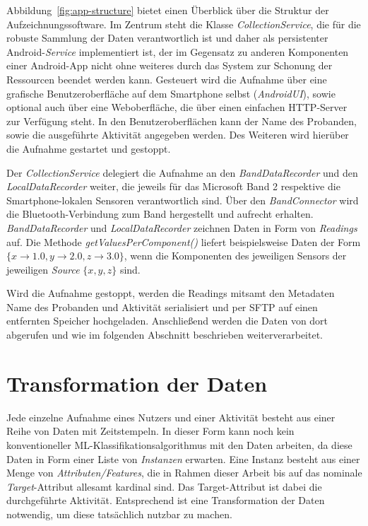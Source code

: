Abbildung~\ref{fig:app-structure} bietet einen Überblick über die Struktur der Aufzeichnungssoftware. Im Zentrum steht die Klasse \textit{CollectionService}, die für die robuste Sammlung der Daten verantwortlich ist und daher als persistenter Android-\textit{Service} implementiert ist, der im Gegensatz zu anderen Komponenten einer Android-App nicht ohne weiteres durch das System zur Schonung der Ressourcen beendet werden kann. Gesteuert wird die Aufnahme über eine grafische Benutzeroberfläche auf dem Smartphone selbst (\textit{AndroidUI}), sowie optional auch über eine Weboberfläche, die über einen einfachen HTTP-Server zur Verfügung steht. In den Benutzeroberflächen kann der Name des Probanden, sowie die ausgeführte Aktivität angegeben werden. Des Weiteren wird hierüber die Aufnahme gestartet und gestoppt.

Der \textit{CollectionService} delegiert die Aufnahme an den \textit{BandDataRecorder} und den \textit{LocalDataRecorder} weiter, die jeweils für das Microsoft Band 2 respektive die Smartphone-lokalen Sensoren verantwortlich sind. Über den \textit{BandConnector} wird die Bluetooth-Verbindung zum Band hergestellt und aufrecht erhalten. \textit{BandDataRecorder} und \textit{LocalDataRecorder} zeichnen Daten in Form von \textit{Readings} auf. Die Methode \textit{getValuesPerComponent()} liefert beispielsweise Daten der Form $\{x \to 1.0, y \to 2.0, z \to 3.0\}$, wenn die Komponenten des jeweiligen Sensors der jeweiligen \textit{Source} $\{x, y, z\}$ sind.

Wird die Aufnahme gestoppt, werden die Readings mitsamt den Metadaten Name des Probanden und Aktivität serialisiert und per SFTP auf einen entfernten Speicher hochgeladen. Anschließend werden die Daten von dort abgerufen und wie im folgenden Abschnitt beschrieben weiterverarbeitet.

\section{Transformation der Daten}
\label{sec:transformation}
Jede einzelne Aufnahme eines Nutzers und einer Aktivität besteht aus einer Reihe von Daten mit Zeitstempeln. In dieser Form kann noch kein konventioneller ML-Klassifikationsalgorithmus mit den Daten arbeiten, da diese Daten in Form einer Liste von \textit{Instanzen} erwarten. Eine Instanz besteht aus einer Menge von \textit{Attributen/Features}, die in Rahmen dieser Arbeit bis auf das nominale \textit{Target}-Attribut allesamt kardinal sind. Das Target-Attribut ist dabei die durchgeführte Aktivität. Entsprechend ist eine Transformation der Daten notwendig, um diese tatsächlich nutzbar zu machen.

